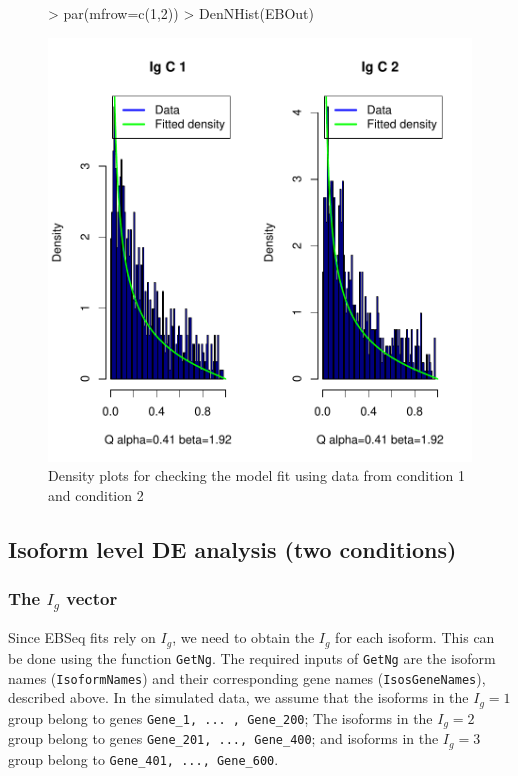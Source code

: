\documentclass{article}
\begin{document}
\begin{figure}[h!]
\centering
\begin{Schunk}
\begin{Sinput}
> par(mfrow=c(1,2))
> DenNHist(EBOut)
\end{Sinput}
\end{Schunk}
\includegraphics{EBSeq_Vignette-024}
\caption{Density plots for checking the model fit using data from condition 1 and condition 2}
\label{fig:GeneDenNHist}
\end{figure}

\newpage
\subsection{Isoform level DE analysis (two conditions)}
\label{sec:detailedisode}
\subsubsection{The $I_g$ vector}
\label{sec:detailedisodeNg}
Since EBSeq fits rely on $I_g$, 
we need to obtain the $I_g$ for each isoform. This can be done using the 
function \verb+GetNg+. 
The required inputs of \verb+GetNg+ are the isoform names (\verb+IsoformNames+) and 
their corresponding gene names (\verb+IsosGeneNames+), described above.
In the simulated data, we assume that the isoforms in the $I_g=1$ group belong to genes \verb+Gene_1, ... , Gene_200+; 
The isoforms in the $I_g=2$ group belong to genes 
\verb+Gene_201, ..., Gene_400+; and isoforms in the $I_g=3$ group 
belong to \verb+Gene_401, ..., Gene_600+.
\end{document}
